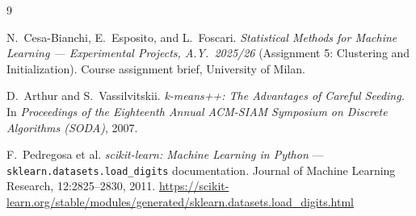 \documentclass[a4paper,11pt]{article}
\begin{document}
\begin{thebibliography}{9}

N.\ Cesa-Bianchi, E.\ Esposito, and L.\ Foscari.
\textit{Statistical Methods for Machine Learning --- Experimental Projects, A.Y.\ 2025/26}
(Assignment 5: Clustering and Initialization). Course assignment brief, University of Milan.

D.\ Arthur and S.\ Vassilvitskii.
\textit{k-means++: The Advantages of Careful Seeding.}
In \textit{Proceedings of the Eighteenth Annual ACM-SIAM Symposium on Discrete Algorithms
(SODA)}, 2007.

F.\ Pedregosa et al.
\textit{scikit-learn: Machine Learning in Python} --- \texttt{sklearn.datasets.load\_digits}
documentation. Journal of Machine Learning Research, 12:2825--2830, 2011.
\url{https://scikit-learn.org/stable/modules/generated/sklearn.datasets.load_digits.html}

\end{thebibliography}
\end{document}
